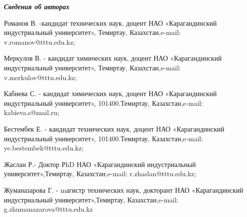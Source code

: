 \emph{{\bfseries Сведения об авторах}}

Романов В. -кандидат технических наук, доцент НАО «Карагандинский
индустриальный университет», Темиртау, Казахстан,e-mail:
v.romanov@tttu.edu.kz;

Меркулов В. - кандидат химических наук, доцент НАО «Карагандинский
индустриальный университет», Темиртау, Казахстан,e-mail:
v.merkulov@tttu.edu.kz;

Кабиева С. - кандидат химических наук, доцент НАО «Карагандинский
индустриальный университет», 101400.Темиртау, Казахстан,e-mail:
kabieva.s@mail.ru;

Бестембек Е. - кандидат технических наук, доцент НАО «Карагандинский
индустриальный университет», 101400.Темиртау, Казахстан,e-mail:
ye.bestembek@tttu.edu.kz;

Жаслан Р.- Доктор РhD НАО «Карагандинский индустриальный
университет»,Темиртау, Казахстан,e-mail: r.zhaslan@tttu.edu.kz;

Жуманазарова Г. - mагистр технических наук, докторант НАО
«Карагандинский индустриальный университет»,Темиртау, Казахстан,e-mail:
g.zhumanazarova@tttu.edu.kz
